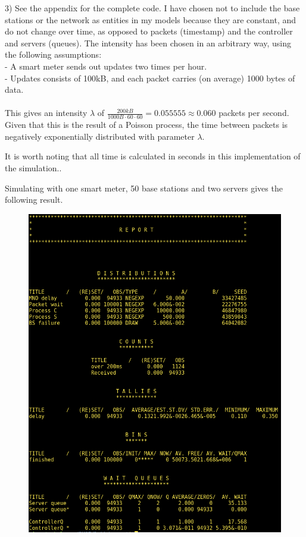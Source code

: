 \documentclass[11pt]{article}
\begin{document}
3)
See the appendix for the complete code. I have chosen not to include the base stations or the network as entities in my models because they are constant, and do not change over time, as opposed to packets (timestamp) and the controller and servers (queues). The intensity has been chosen in an arbitrary way, using the following assumptions:\\
- A smart meter sends out updates two times per hour.\\
- Updates consists of 100kB, and each packet carries (on average) 1000 bytes of data.\\\\
This gives an intensity $\lambda$ of $\frac{200kB}{1000B \cdot 60 \cdot 60} = 0.055555 \approx 0.060$ packets per second.
Given that this is the result of a Poisson process, the time between packets is negatively exponentially distributed with parameter $\lambda$.

It is worth noting that all time is calculated in seconds in this implementation of the simulation..

Simulating with one smart meter, 50 base stations and two servers gives the following result.

\begin{figure}[H]
	\includegraphics[width=\textwidth]{demos_1.png}
	\centering
\end{figure}
\end{document}
